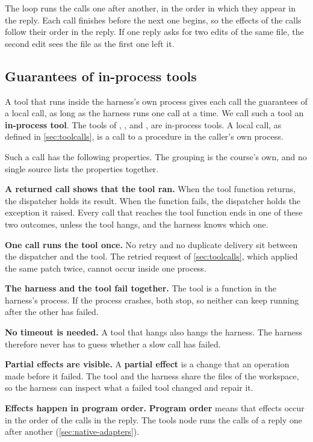 The loop runs the calls one after another, in the order in which they appear in the reply. Each
call finishes before the next one begins, so the effects of the calls follow their order in the
reply. If one reply asks for two edits of the same file, the second edit sees the file as the first
one left it.

\subsection{Guarantees of in-process tools}
\label{sec:native-local}

A tool that runs inside the harness's own process gives each call the guarantees of a local call,
as long as the harness runs one call at a time. We call such a tool an \textbf{in-process tool}. The
tools of \msa{}, ,  and , are in-process tools. A
local call, as defined in \cref{sec:toolcalls}, is a call to a procedure in the caller's own
process.

Such a call has the following properties. The grouping is the course's own, and no single source
lists the properties together.
\bi
\item \textbf{A returned call shows that the tool ran.} When the tool function returns, the
dispatcher holds its result. When the function fails, the dispatcher holds the exception it raised.
Every call that reaches the tool function ends in one of these two outcomes, unless the tool hangs,
and the harness knows which one.
\item \textbf{One call runs the tool once.} No retry and no duplicate delivery sit between the
dispatcher and the tool. The retried request of \cref{sec:toolcalls}, which applied the same patch
twice, cannot occur inside one process.
\item \textbf{The harness and the tool fail together.} The tool is a function in the harness's
process. If the process crashes, both stop, so neither can keep running after the other has failed.
\item \textbf{No timeout is needed.} A tool that hangs also hangs the harness. The harness therefore
never has to guess whether a slow call has failed.
\item \textbf{Partial effects are visible.} A \textbf{partial effect} is a change that an operation
made before it failed. The tool and the harness share the files of the workspace, so the harness can
inspect what a failed tool changed and repair it.
\item \textbf{Effects happen in program order.} \textbf{Program order} means that effects occur in
the order of the calls in the reply. The tools node runs the calls of a reply one after another
(\cref{sec:native-adapters}).
\ei

